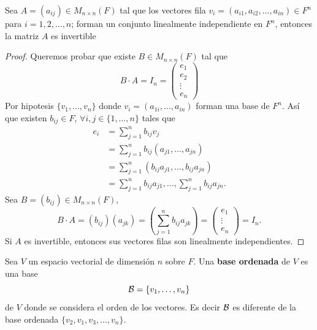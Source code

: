 \documentclass[12pt,a4paper]{book}
\newcommand{\parentesis}[1]{\left(#1\right)}
\begin{document}
    \begin{proposicion}
        Sea $A=(a_{ij})\in M_{n\times n}(F)$ tal que los vectores fila $v_{i}=(a_{i1},a_{i2},\dots,a_{in})\in F^{n}$
        para $i=1,2,\dots,n$; forman un conjunto linealmente independiente en $F^{n}$, entonces la
        matriz $A$ es invertible
    \end{proposicion}

    \begin{proof}
        Queremos probar que existe $B\in M_{n\times n}(F)$ tal que
        \begin{equation*}
            B\cdot A=I_{n}=
            \begin{pmatrix}
                e_{1}\\
                e_{2}\\
                \vdots\\
                e_{n}
            \end{pmatrix}
        \end{equation*}
        Por hipotesis $\{v_{1},\dots,v_{n}\}$ donde $v_{i}=(a_{1i},\dots,a_{in})$ forman una base de
        $F^{n}$. Así que existen $b_{ij}\in F$, $\forall i,j\in\{1,\dots,n\}$ tales que
        \begin{align*}
            e_{i}&=\sum_{j=1}^{n}b_{ij}v_{j}\\
            &=\sum_{j=1}^{n}b_{ij}(a_{j1},\dots,a_{jn})\\
            &=\sum_{j=1}^{n}(b_{ij}a_{j1},\dots,b_{ij}a_{jn})\\
            &=\sum_{j=1}^{n}b_{ij}a_{j1},\dots,\sum_{j=1}^{n}b_{ij}a_{jn}.
        \end{align*}
        Sea $B=(b_{ij})\in M_{n\times n}(F)$,
        \begin{equation*}
            B\cdot A=(b_{ij})(a_{jk})=\parentesis{\sum_{j=1}^{n}b_{ij}a_{jk}}=
            \begin{pmatrix}
                e_{1}\\
                \vdots\\
                e_{n}
            \end{pmatrix}
            =I_{n}.
        \end{equation*}
        Si $A$ es invertible, entonces sus vectores filas son linealmente independientes.
    \end{proof}

    \begin{definicion}
        Sea $V$ un espacio vectorial de dimensión $n$ sobre $F$. Una \textbf{base ordenada}
        de $V$ es una base
        \begin{equation*}
            \mathcal{B}=\{v_{1},\dots,v_{n}\}
        \end{equation*}
        de $V$ donde se considera el orden de los vectores. Es decir $\mathcal{B}$ es diferente
        de la base ordenada $\{v_{2},v_{1},v_{3},\dots,v_{n}\}$.
    \end{definicion}
\end{document}
